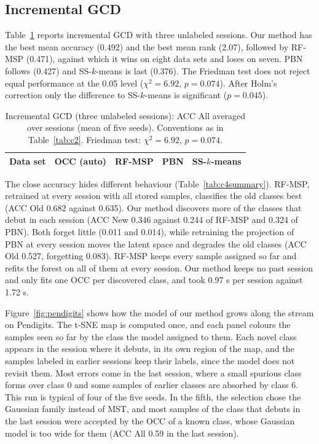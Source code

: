 \documentclass[pdflatex,sn-basic]{sn-jnl}
\begin{document}
\subsection{Incremental GCD}\label{sec:res-c4}

Table~\ref{tab:c4} reports incremental GCD with three unlabeled sessions. Our method has the best mean accuracy (0.492) and the best mean rank (2.07), followed by RF-MSP (0.471), against which it wins on eight data sets and loses on seven. PBN follows (0.427) and SS-$k$-means is last (0.376). The Friedman test does not reject equal performance at the 0.05 level ($\chi^2 = 6.92$, $p = 0.074$). After Holm's correction only the difference to SS-$k$-means is significant ($p = 0.045$).

\begin{table}[t]
\caption{Incremental GCD (three unlabeled sessions): ACC All averaged over sessions (mean of five seeds). Conventions as in Table~\ref{tab:c2}. Friedman test: $\chi^2 = 6.92$, $p = 0.074$.}\label{tab:c4}
\centering\footnotesize
\begin{tabular}{@{}lrrrr@{}}
\toprule
Data set & OCC (auto) & RF-MSP & PBN & SS-$k$-means \\
\midrule

\end{tabular}
\end{table}

The close accuracy hides different behaviour (Table~\ref{tab:c4summary}). RF-MSP, retrained at every session with all stored samples, classifies the old classes best (ACC Old 0.682 against 0.635). Our method discovers more of the classes that debut in each session (ACC New 0.346 against 0.244 of RF-MSP and 0.324 of PBN). Both forget little (0.011 and 0.014), while retraining the projection of PBN at every session moves the latent space and degrades the old classes (ACC Old 0.527, forgetting 0.083). RF-MSP keeps every sample assigned so far and refits the forest on all of them at every session. Our method keeps no past session and only fits one OCC per discovered class, and took 0.97 s per session against 1.72 s.

Figure~\ref{fig:pendigits} shows how the model of our method grows along the stream on Pendigits. The t-SNE map is computed once, and each panel colours the samples seen so far by the class the model assigned to them. Each novel class appears in the session where it debuts, in its own region of the map, and the samples labeled in earlier sessions keep their labels, since the model does not revisit them. Most errors come in the last session, where a small spurious class forms over class 0 and some samples of earlier classes are absorbed by class 6. This run is typical of four of the five seeds. In the fifth, the selection chose the Gaussian family instead of MST, and most samples of the class that debuts in the last session were accepted by the OCC of a known class, whose Gaussian model is too wide for them (ACC All 0.59 in the last session).
\end{document}
